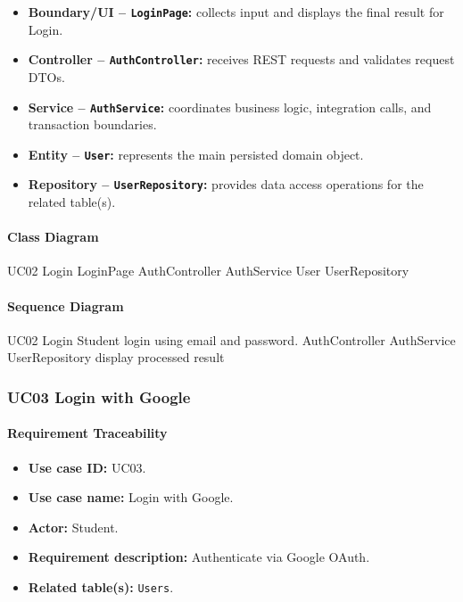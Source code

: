 \begin{itemize}
    \item \textbf{Boundary/UI -- \texttt{LoginPage}:} collects input and displays the final result for Login.
    \item \textbf{Controller -- \texttt{AuthController}:} receives REST requests and validates request DTOs.
    \item \textbf{Service -- \texttt{AuthService}:} coordinates business logic, integration calls, and transaction boundaries.
    \item \textbf{Entity -- \texttt{User}:} represents the main persisted domain object.
    \item \textbf{Repository -- \texttt{UserRepository}:} provides data access operations for the related table(s).
\end{itemize}

\paragraph{Class Diagram}

\ClassDiagram
{UC02 Login}
{LoginPage}
{AuthController}
{AuthService}
{User}
{UserRepository}

\paragraph{Sequence Diagram}

\SequenceDiagram
{UC02 Login}
{Student}
{login using email and password.}
{AuthController}
{AuthService}
{UserRepository}
{display processed result}

\subsubsection{UC03 Login with Google}

\paragraph{Requirement Traceability}

\begin{itemize}
    \item \textbf{Use case ID:} UC03.
    \item \textbf{Use case name:} Login with Google.
    \item \textbf{Actor:} Student.
    \item \textbf{Requirement description:} Authenticate via Google OAuth.
    \item \textbf{Related table(s):} \texttt{Users}.
\end{itemize}


